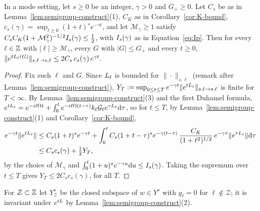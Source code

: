 \begin{proposition}
\label{prop:large-sectors}
In a mode setting, let $s\ge0$ be an integer, $\gamma>0$ and $G_+\ge0$. Let
$C_s$ be as in Lemma~\ref{lem:semigroup-construct}\textup{(1)}, $C_K$ as in
Corollary~\ref{cor:K-bound}, $c_s(\gamma)=\sup_{t\ge0}(1+t)^se^{-\gamma t}$, and let
$\mathcal M_\gamma\ge1$ satisfy $C_sC_K(1+\mathcal M_\gamma^2)^{-1/2}I_{s}(\gamma)\le\frac12$,
with $I_{s}(\gamma)$ as in Equation~\eqref{eq:Ip}. Then
for every $\ell\in\mathbb{Z}$ with $|\ell|\ge\mathcal M_\gamma$, every $G$ with $|G|\le G_+$ and
every $t\ge0$,
$\|e^{tL_{\ell}(G)}\|_{s,\ell\to s,\ell}\le2C_s\,c_s(\gamma)\,e^{\gamma t}$.
\end{proposition}
\begin{proof}
Fix such $\ell$ and $G$. Since $L_{\ell}$ is bounded for $\|\cdot\|_{s,\ell}$
(remark after Lemma~\ref{lem:semigroup-construct}),
$Y_T:=\sup_{0\le t\le T}e^{-\gamma t}\|e^{tL_{\ell}}\|_{s,\ell\to s,\ell}$ is finite
for $T<\infty$. By Lemma~\ref{lem:semigroup-construct}(3) and the first Duhamel
formula,
$e^{tL_{\ell}}=e^{-i\ell\Omega t}+\int_0^te^{-i\ell\Omega(t-\tau)}k_\ell\mathcal{G}_\ell e^{\tau L_{\ell}}\dd\tau$,
so for $t\le T$, by Lemma~\ref{lem:semigroup-construct}(1) and
Corollary~\ref{cor:K-bound},
\begin{align*}
e^{-\gamma t}\|e^{tL_{\ell}}\|&\le C_s(1+t)^se^{-\gamma t}
+\int_0^tC_s(1+t-\tau)^se^{-\gamma(t-\tau)}\,\frac{C_K}{(1+\ell^2)^{1/2}}\,e^{-\gamma\tau}\|e^{\tau L_{\ell}}\|\dd\tau\\
&\le C_sc_s(\gamma)+\tfrac12Y_T,
\end{align*}
by the choice of $\mathcal M_\gamma$ and $\int_0^t(1+u)^se^{-\gamma u}\dd u\le I_{s}(\gamma)$.
Taking the supremum over $t\le T$ gives $Y_T\le2C_sc_s(\gamma)$, for all $T$.
\end{proof}

For $\mathcal Z\subset\mathbb{Z}$ let $Y^s_{\mathcal Z}$ be the closed subspace of
$w\in Y^s$ with $g_\ell=0$ for $\ell\notin\mathcal Z$; it is invariant under
$e^{tL}$ by Lemma~\ref{lem:semigroup-construct}(2).

